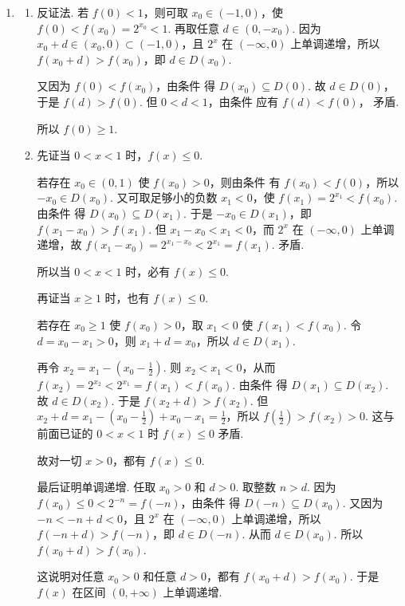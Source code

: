\begin{solution}
\begin{enumerate}
若 \(x_1<0<x_2\)，则 \(f(x_1)=2^{x_1}>0>-2^{-x_2}=f(x_2)\)，
这与 \(f(x_1)\le f(x_2)\) 矛盾，所以这种情况不可能出现.

若 \(x_2<0<x_1\)，则 \(f(x_2)=2^{x_2}>0>-2^{-x_1}=f(x_1)\)，从而 \(f(x_1)\le f(x_2)\) 恒成立. 此时 \(D(x_2)=\left( 0,-x_2 \right)\subseteq \left( 0,+\infty \right)\subseteq D(x_1)\).

综上，总有 \(D(x_2)\subseteq D(x_1)\).

\item
\begin{enumerate}
\item 反证法. 若 \(f(0)<1\)，则可取 \(x_0\in(-1,0)\)，使 \(f(0)<f(x_0)=2^{x_0}<1\). 再取任意 \(d\in\left( 0,-x_0 \right)\). 因为 \(x_0+d\in(x_0,0)\subset(-1,0)\)，且 \(2^x\) 在 \((-\infty,0)\) 上单调递增，所以 \(f(x_0+d)>f(x_0)\)，即 \(d\in D(x_0)\).

又因为 \(f(0)<f(x_0)\)，由条件  得 \(D(x_0)\subseteq D(0)\). 故 \(d\in D(0)\)，于是 \(f(d)>f(0)\). 但 \(0<d<1\)，由条件  应有 \(f(d)<f(0)\)，
矛盾.

所以 \(f(0)\ge 1\).

\item 先证当 \(0<x<1\) 时，\(f(x)\le 0\).

若存在 \(x_0\in(0,1)\) 使 \(f(x_0)>0\)，则由条件  有 \(f(x_0)<f(0)\)，所以 \(-x_0\in D(x_0)\). 又可取足够小的负数 \(x_1<0\)，使 \(f(x_1)=2^{x_1}<f(x_0)\). 由条件  得 \(D(x_0)\subseteq D(x_1)\). 于是 \(-x_0\in D(x_1)\)，即 \(f(x_1-x_0)>f(x_1)\).
但 \(x_1-x_0<x_1<0\)，而 \(2^x\) 在 \((-\infty,0)\) 上单调递增，故 \(f(x_1-x_0)=2^{x_1-x_0}<2^{x_1}=f(x_1)\).
矛盾.

所以当 \(0<x<1\) 时，必有 \(f(x)\le 0\).

再证当 \(x\ge 1\) 时，也有 \(f(x)\le 0\).

若存在 \(x_0\ge 1\) 使 \(f(x_0)>0\)，取 \(x_1<0\) 使 \(f(x_1)<f(x_0)\). 令 \(d=x_0-x_1>0\)，则 \(x_1+d=x_0\)，所以 \(d\in D(x_1)\).

再令 \(x_2=x_1-\left( x_0-\frac{1}{2} \right)\). 则 \(x_2<x_1<0\)，从而 \(f(x_2)=2^{x_2}<2^{x_1}=f(x_1)<f(x_0)\). 由条件  得 \(D(x_1)\subseteq D(x_2)\). 故 \(d\in D(x_2)\). 于是 \(f(x_2+d)>f(x_2)\). 但 \(x_2+d=x_1-\left( x_0-\frac{1}{2} \right)+x_0-x_1=\frac{1}{2}\)，所以 \(f\left( \frac{1}{2} \right)>f(x_2)>0\).
这与前面已证的 \(0<x<1\) 时 \(f(x)\le 0\) 矛盾.

故对一切 \(x>0\)，都有 \(f(x)\le 0\).

最后证明单调递增. 任取 \(x_0>0\) 和 \(d>0\). 取整数 \(n>d\). 因为 \(f(x_0)\le 0<2^{-n}=f(-n)\)，由条件  得 \(D(-n)\subseteq D(x_0)\). 又因为 \(-n< -n+d<0\)，且 \(2^x\) 在 \((-\infty,0)\) 上单调递增，所以 \(f(-n+d)>f(-n)\)，即 \(d\in D(-n)\). 从而 \(d\in D(x_0)\). 所以 \(f(x_0+d)>f(x_0)\).

这说明对任意 \(x_0>0\) 和任意 \(d>0\)，都有 \(f(x_0+d)>f(x_0)\).
于是 \(f(x)\) 在区间 \((0,+\infty)\) 上单调递增.
\end{enumerate}
\end{enumerate}
\end{solution}
